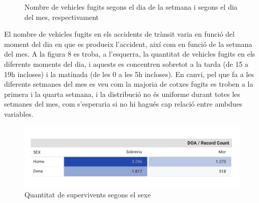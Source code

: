 \documentclass[11pt,longbibliography]{article}
\theoremstyle{definition}
\theoremstyle{remark}
\begin{document}
\begin{figure}[h!]
\par
{}%
\hfill
{}%
\par

\caption{Nombre de vehicles fugits segons el dia de la setmana i segons el dia del mes, respectivament}
\label{fig:G4}
\end{figure}

El nombre de vehicles fugits en els accidents de trànsit varia en funció del moment del dia en que es produeix l'accident, així com en funció de la setmana del mes. A la figura 8 es troba, a l'esquerra, la quantitat de vehicles fugits en els diferents moments del dia, i aquests es concentren sobretot a la tarda (de 15 a 19h incloses) i la matinada (de les 0 a les 5h incloses). En canvi, pel que fa a les diferents setmanes del mes es veu com la majoria de cotxes fugits es troben a la primera i la quarta setmana, i la distribució no és uniforme durant totes les setmanes del mes, com s'esperaria si no hi hagués cap relació entre ambdues variables.

\begin{figure}[H]
\begin{center}
\includegraphics[width=15cm]{Table1}
\end{center}
\caption{Quantitat de supervivents segons el sexe}
\label{fig:G5}
\end{figure}
\end{document}

